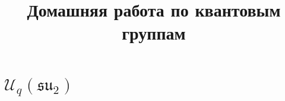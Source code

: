 \documentclass[a4paper]{article}
\title{Домашняя работа по квантовым группам}
\begin{document}
	\maketitle
	\section*{$\mathcal{U}_q\left( \mathfrak{su}_2 \right) $}
\end{document}
